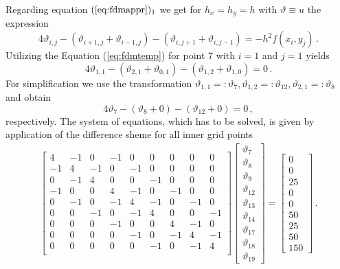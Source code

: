 Regarding equation $(\ref{eq:fdmappr})_1$  we get for 
$h_x = h_y = h$ with $\vartheta \equiv u$ the expression
%
\begin{equation}
4 \vartheta_{i,j} - ( \vartheta_{i+1,j} + \vartheta_{i-1,j}) - 
( \vartheta_{i,j+1} + \vartheta_{i,j-1} ) = - h^2 f(x_i,y_j) \, .
\label{eq:fdmtemp}
\end{equation}
%
Utilizing the Equation (\ref{eq:fdmtemp}) for point 7
with $i=1$ and $j=1$ yields
%
\begin{equation}
4 \vartheta_{1,1} - ( \vartheta_{2,1} + \vartheta_{0,1}) - 
( \vartheta_{1,2} + \vartheta_{1,0} ) = 0 \, .
\end{equation}
%
For simplification we use the transformation 
$\vartheta_{1,1} =: \vartheta_{7}, 
\vartheta_{1,2} =: \vartheta_{12}, 
\vartheta_{2,1} =: \vartheta_{8}$ and obtain 
%
\begin{equation}
 4\vartheta_7 - (\vartheta_8+0)-(\vartheta_{12}+0 ) = 0 \,,
\end{equation}
%
respectively.
The system of equations, which has to be solved, is given
by application of the difference sheme for all inner
grid points
%
\begin{eqnarray}
\left[ 
\begin{array}{rrrrrrrrr}
 4 & -1 &  0 & -1 &  0 &  0  &  0 &  0 &  0 \\
-1 &  4 & -1 &  0 & -1 &  0  &  0 &  0 &  0 \\
 0 & -1 &  4 &  0 &  0 & -1  &  0 &  0 &  0 \\
-1 &  0 &  0 &  4 & -1 &  0  & -1 &  0 &  0 \\
 0 & -1 &  0 & -1 &  4 & -1  &  0 & -1 &  0 \\
 0 &  0 & -1 &  0 & -1 &  4  &  0 &  0 & -1 \\
 0 &  0 &  0 & -1 &  0 &  0  &  4 & -1 &  0 \\
 0 &  0 &  0 &  0 & -1 &  0  & -1 &  4 & -1 \\
 0 &  0 &  0 &  0 &  0 & -1  & 0  & -1 &  4 \\
\end{array}
\right] 
\left[ 
\begin{array}{c}
\vartheta_7 \\ \vartheta_8 \\ \vartheta_9 \\ \vartheta_{12}\\ 
\vartheta_{13} \\
\vartheta_{14} \\ \vartheta_{17} \\ \vartheta_{18} \\ \vartheta_{19}
\end{array}
\right] = 
\left[ 
\begin{array}{r}
0 \\ 0 \\ 25 \\ 0 \\ 0 \\ 50 \\ 25 \\ 50 \\ 150
\end{array}
\right] \, . 
\end{eqnarray}
